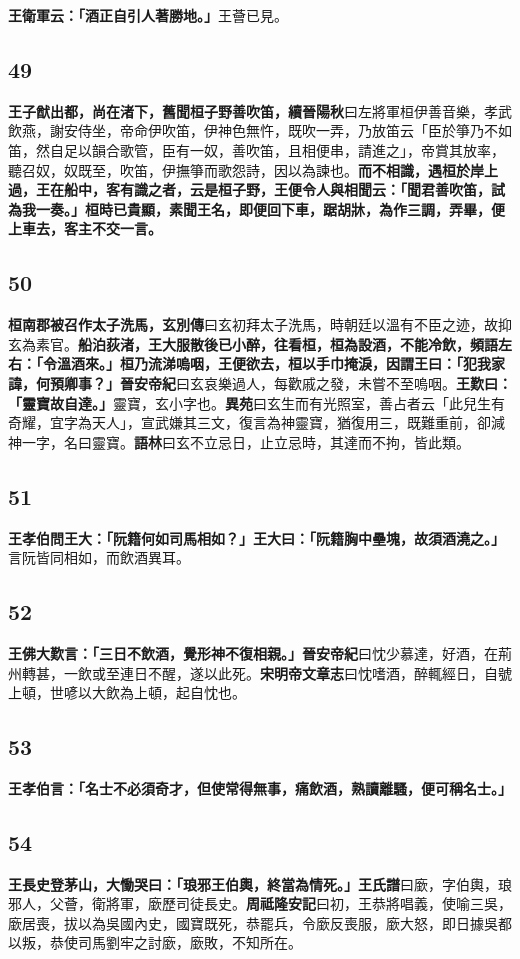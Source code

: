 \textbf{王衛軍云：「酒正自引人著勝地。」}{\footnotesize 王薈已見。}

\subsection*{49}

\textbf{王子猷出都，尚在渚下，舊聞桓子野善吹笛，}{\footnotesize \textbf{續晉陽秋}曰左將軍桓伊善音樂，孝武飲燕，謝安侍坐，帝命伊吹笛，伊神色無忤，既吹一弄，乃放笛云「臣於箏乃不如笛，然自足以韻合歌管，臣有一奴，善吹笛，且相便串，請進之」，帝賞其放率，聽召奴，奴既至，吹笛，伊撫箏而歌怨詩，因以為諫也。}\textbf{而不相識，遇桓於岸上過，王在船中，客有識之者，云是桓子野，王便令人與相聞云：「聞君善吹笛，試為我一奏。」桓時已貴顯，素聞王名，即便回下車，踞胡牀，為作三調，弄畢，便上車去，客主不交一言。}

\subsection*{50}

\textbf{桓南郡被召作太子洗馬，}{\footnotesize \textbf{玄別傳}曰玄初拜太子洗馬，時朝廷以溫有不臣之迹，故抑玄為素官。}\textbf{船泊荻渚，王大服散後已小醉，往看桓，桓為設酒，不能冷飲，頻語左右：「令溫酒來。」桓乃流涕嗚咽，王便欲去，桓以手巾掩淚，因謂王曰：「犯我家諱，何預卿事？」}{\footnotesize \textbf{晉安帝紀}曰玄哀樂過人，每歡戚之發，未嘗不至嗚咽。}\textbf{王歎曰：「靈寶故自達。」}{\footnotesize 靈寶，玄小字也。\textbf{異苑}曰玄生而有光照室，善占者云「此兒生有奇耀，宜字為天人」，宣武嫌其三文，復言為神靈寶，猶復用三，既難重前，卻減神一字，名曰靈寶。\textbf{語林}曰玄不立忌日，止立忌時，其達而不拘，皆此類。}

\subsection*{51}

\textbf{王孝伯問王大：「阮籍何如司馬相如？」王大曰：「阮籍胸中壘塊，故須酒澆之。」}{\footnotesize 言阮皆同相如，而飲酒異耳。}

\subsection*{52}

\textbf{王佛大歎言：「三日不飲酒，覺形神不復相親。」}{\footnotesize \textbf{晉安帝紀}曰忱少慕達，好酒，在荊州轉甚，一飲或至連日不醒，遂以此死。\textbf{宋明帝文章志}曰忱嗜酒，醉輒經日，自號上頓，世喭以大飲為上頓，起自忱也。}

\subsection*{53}

\textbf{王孝伯言：「名士不必須奇才，但使常得無事，痛飲酒，熟讀離騷，便可稱名士。」}

\subsection*{54}

\textbf{王長史登茅山，大慟哭曰：「琅邪王伯輿，終當為情死。」}{\footnotesize \textbf{王氏譜}曰廞，字伯輿，琅邪人，父薈，衛將軍，廞歷司徒長史。\textbf{周祗隆安記}曰初，王恭將唱義，使喻三吳，廞居喪，拔以為吳國內史，國寶既死，恭罷兵，令廞反喪服，廞大怒，即日據吳都以叛，恭使司馬劉牢之討廞，廞敗，不知所在。}